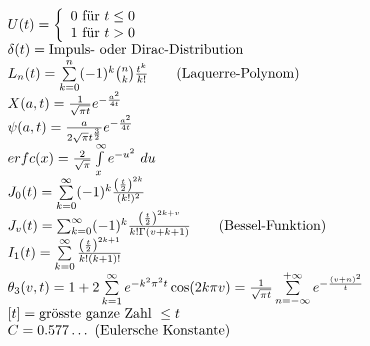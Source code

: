\begin{footnotesize}
\[ \begin{array}{@{}l@{}}
U(t) = 
    \left\lbrace\begin{array}{l}
    0 \text{ für } t \leq 0 \\
    1 \text{ für } t > 0 \\
    \end{array}\right. \\
\delta(t) = 
    \text{Impuls- oder Dirac-Distribution} \\
L_n(t) = 
    \sum\limits_{k=0}^n (-1)^k \binom{n}{k} \frac{t^k}{k!} \qquad \text{(Laquerre-Polynom)} \\
X(a, t) = 
    \frac{1}{\sqrt{\pi t}} e^{-\frac{a^2}{4t}} \\
\psi(a, t) = 
    \frac{a}{2 \sqrt{\pi} t^{\frac{3}{2}}} e^{-\frac{a^2}{4t}} \\
erfc(x) = 
    \frac{2}{\sqrt{\pi}} \int\limits_x^\infty e^{-u^2} ~ du \\
J_0(t) = 
    \sum\limits_{k=0}^{\infty} (-1)^k \frac{\left(\frac{t}{2}\right)^{2k}}{(k!)^2} \\
J_v(t) = 
    \sum_{k=0}^{\infty} (-1)^k \frac{\left(\frac{t}{2}\right)^{2k + v}}{k! \Gamma(v + k + 1)} \qquad \text{(Bessel-Funktion)} \\
I_1(t) = 
    \sum\limits_{k=0}^{\infty} \frac{\left(\frac{t}{2}\right)^{2k + 1}}{k! (k + 1)!} \\
\theta_3(v, t) = 
    1 + 2 \sum\limits_{k=1}^{\infty} e^{-k^2 \pi^2 t} \cos(2 k \pi v) = 
    \frac{1}{\sqrt{\pi t}} \sum\limits_{n=-\infty}^{+\infty} e^{-\frac{(v + n)^2}{t}} \\
{[t]} = 
    \text{grösste ganze Zahl } \leq t \\
C = 
    0.577\ldots \text{ (Eulersche Konstante)} \\
\end{array} \]
\end{footnotesize}

